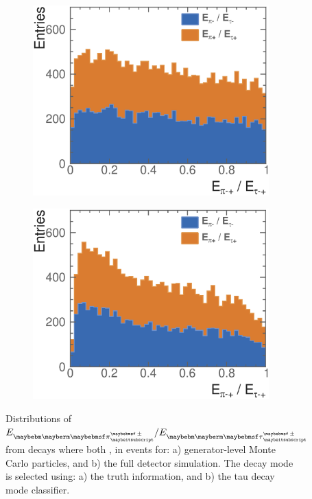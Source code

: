 \begin{figure}[htbp]
\centering %
\begin{subfigure}[b]{0.45\textwidth}
  \includegraphics[width=\textwidth]{tau/NoTimeAnalysis/1DMC}
  \caption{}
  \label{fig:TauSpin1DMC}
\end{subfigure}
\begin{subfigure}[b]{0.45\textwidth}
  \includegraphics[width=\textwidth]{tau/NoTimeAnalysis/1DrecoNoOverflow}
  \caption{}
  \label{fig:TauSpin1Dreco}
\end{subfigure}
\caption
{Distributions of $E_{\Ppipm}/E_{\Ptaupm}$ from \ZToTauTau decays where both \tauToPionBoth, in \eeZZQQ events for: a) generator-level  Monte Carlo particles, and b) the full detector simulation. The \tauToPionBoth decay mode is selected using: a) the truth information, and b) the tau decay mode classifier.}
\label{fig:TauSpin1D}
\end{figure}



